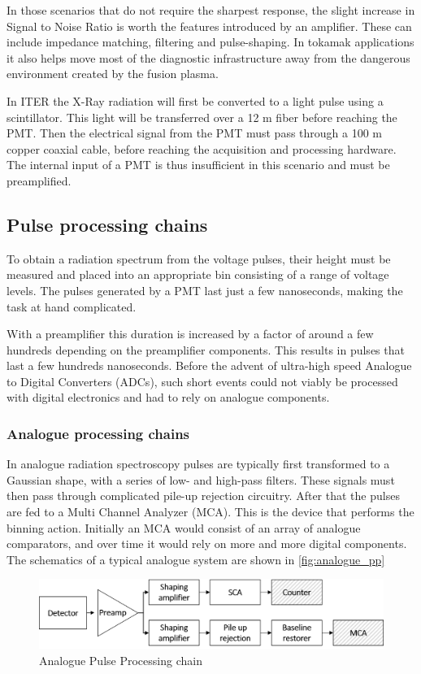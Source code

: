 In those scenarios that do not require the sharpest response,
the slight increase in Signal to Noise Ratio is worth the 
features introduced by an amplifier. These can include
impedance matching, filtering and pulse-shaping.
In tokamak applications it also helps move most of the 
diagnostic infrastructure away from the dangerous environment
created by the fusion plasma. 


In ITER the X-Ray radiation will first be converted to a light pulse
using a scintillator. This light will be transferred over a 12 m 
fiber before reaching the PMT. Then the electrical signal from 
the PMT must pass through a 100 m copper coaxial cable, before
reaching the acquisition and processing hardware. The internal 
input of a PMT is thus insufficient in this scenario and must be 
preamplified.
\cite{low_noise_amplifier_for_pmt}

\subsection{Pulse processing chains}

To obtain a radiation spectrum from the voltage pulses,
their height must be measured and
placed into an appropriate bin consisting of a range of voltage levels.
The pulses generated by a PMT last just a few nanoseconds,
making the task at hand complicated.


With a preamplifier this duration is increased by a factor of around
a few hundreds depending on the preamplifier components.
This results in pulses that last a few hundreds nanoseconds.
Before the advent of ultra-high speed Analogue to Digital Converters (ADCs),
such short events could not viably be processed with digital 
electronics and had to rely on analogue components.

\subsubsection{Analogue processing chains}

In analogue radiation spectroscopy
pulses are typically first transformed to a Gaussian shape,
with a series of low- and high-pass filters.
These signals must then pass through complicated pile-up
rejection circuitry. After that the pulses 
are fed to a Multi Channel Analyzer (MCA).
This is the device that performs the binning action.
Initially an MCA would consist of an array of 
analogue comparators, and over time it would rely 
on more and more digital components.
The schematics of a typical analogue system are shown in \autoref{fig:analogue_pp}
\begin{figure}[H]
  \centering
  \includegraphics[width=\linewidth]{media/analog_pulse_processing.png}
  \caption{Analogue Pulse Processing chain}
  \label{fig:analogue_pp}
\end{figure}



